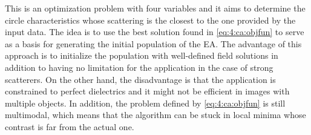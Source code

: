 			This is an optimization problem with four variables and it aims to determine the circle characteristics whose scattering is the closest to the one provided by the input data. The idea is to use the best solution found in \eqref{eq:4:ca:objfun} to serve as a basis for generating the initial population of the EA. The advantage of this approach is to initialize the population with well-defined field solutions in addition to having no limitation for the application in the case of strong scatterers. On the other hand, the disadvantage is that the application is constrained to perfect dielectrics and it might not be efficient in images with multiple objects. In addition, the problem defined by \eqref{eq:4:ca:objfun} is still multimodal, which means that the algorithm can be stuck in local minima whose contrast is far from the actual one.
			

